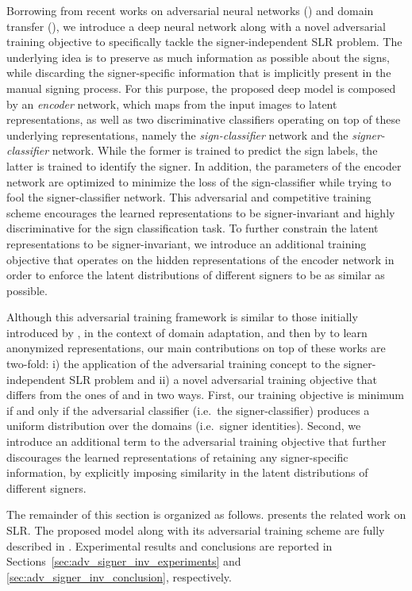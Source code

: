 Borrowing from recent works on adversarial neural networks (\citet{Goodfellow2014, Feutry2018}) and domain transfer (\citet{Ganin2015}), we introduce a deep neural network along with a novel adversarial training objective to specifically tackle the signer-independent SLR problem. The underlying idea is to preserve as much information as possible about the signs, while discarding the signer-specific information that is implicitly present in the manual signing process. For this purpose, the proposed deep model is composed by an \emph{encoder} network, which maps from the input images to latent representations, as well as two discriminative classifiers operating on top of these underlying representations, namely the \emph{sign-classifier} network and the \emph{signer-classifier} network. While the former is trained to predict the sign labels, the latter is trained to identify the signer. In addition, the parameters of the encoder network are optimized to minimize the loss of the sign-classifier while trying to fool the signer-classifier network. This adversarial and competitive training scheme encourages the learned representations to be signer-invariant and highly discriminative for the sign classification task. To further constrain the latent representations to be signer-invariant, we introduce an additional training objective that operates on the hidden representations of the encoder network in order to enforce the latent distributions of different signers to be as similar as possible.

Although this adversarial training framework is similar to those initially introduced by \citet{Ganin2015}, in the context of domain adaptation, and then by \citet{Feutry2018} to learn anonymized representations, our main contributions on top of these works are two-fold: i) the application of the adversarial training concept to the signer-independent SLR problem and ii) a novel adversarial training objective that differs from the ones of \citet{Ganin2015} and \citet{Feutry2018} in two ways. First, our training objective is minimum if and only if the adversarial classifier (i.e.\ the signer-classifier) produces a uniform distribution over the domains (i.e.\ signer identities). Second, we introduce an additional term to the adversarial training objective that further discourages the learned representations of retaining any signer-specific information, by explicitly imposing similarity in the latent distributions of different signers.

The remainder of this section is organized as follows.  presents the related work on SLR. The proposed model along with its adversarial training scheme are fully described in . Experimental results and conclusions are reported in Sections~\ref{sec:adv_signer_inv_experiments} and \ref{sec:adv_signer_inv_conclusion}, respectively.

